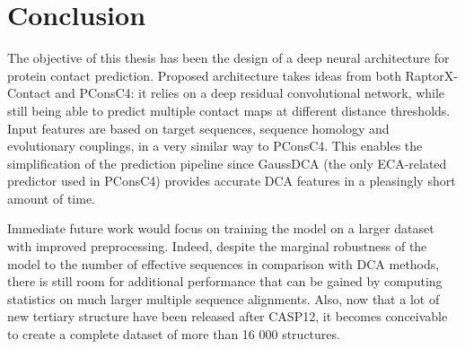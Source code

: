 \chapter{Conclusion}

The objective of this thesis has been the design of a deep neural architecture for protein
contact prediction. Proposed architecture takes ideas from both RaptorX-Contact and PConsC4:
it relies on a deep residual convolutional network, while still being able to predict multiple
contact maps at different distance thresholds. Input features are based on target
sequences, sequence homology and evolutionary couplings, in a very similar way to PConsC4.
This enables the simplification of the prediction pipeline since GaussDCA (the only
ECA-related predictor used in PConsC4) provides accurate DCA features in a pleasingly
short amount of time.


Immediate future work would focus on training the model on a larger
dataset with improved preprocessing. Indeed, despite the marginal
robustness of the model to the number of effective sequences in comparison
with DCA methods, there is still room for additional performance that can
be gained by computing statistics on much larger multiple sequence alignments.
Also, now that a lot of new tertiary structure have been released after CASP12,
it becomes conceivable to create a complete dataset of more than 16 000 structures.


